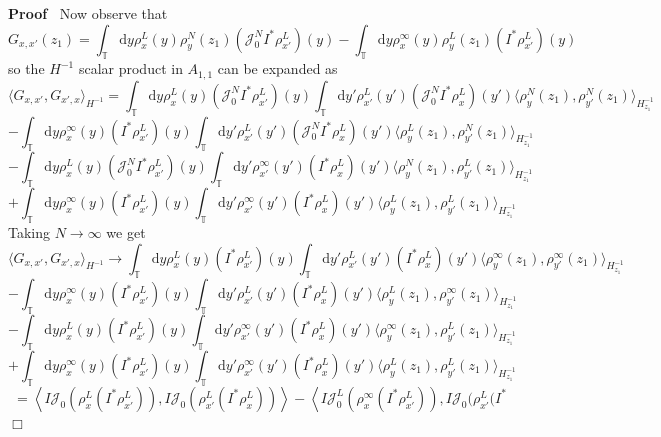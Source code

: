 \documentclass[a4paper,11pt]{article}
\newcommand{\mathd}{\mathrm{d}}
\newenvironment{proof}{\noindent\textbf{Proof\ }}{\hspace*{\fill}$\Box$\medskip}
\newcommand{\JJ}{\mathcal{J}}
\begin{document}
\begin{proof}
  Now observe that
  \[ G_{x, x'} (z_1) = \int_{\mathbb{T}} \mathd y \rho_x^L (y) \rho^N_y (z_1)
     (\JJ^N_0 I^{\ast} \rho_{x'}^L) (y) - \int_{\mathbb{T}} \mathd y
     \rho_x^{\infty} (y) \rho^L_y (z_1) (I^{\ast} \rho_{x'}^L) (y) \]
  so the $H^{- 1}$ scalar product in $A_{1, 1}$ can be expanded as
  \[ \langle G_{x, x'}, G_{x', x} \rangle_{H^{- 1}} = \int_{\mathbb{T}}
     \mathd y \rho_x^L (y) (\JJ^N_0 I^{\ast} \rho_{x'}^L) (y)
     \int_{\mathbb{T}} \mathd y' \rho_{x'}^L (y') (\JJ^N_0 I^{\ast} \rho_x^L)
     (y') \langle \rho^N_y (z_1), \rho^N_{y'} (z_1) \rangle_{H^{- 1}_{z_1}} \]
  \[ - \int_{\mathbb{T}} \mathd y \rho_x^{\infty} (y) (I^{\ast} \rho_{x'}^L)
     (y) \int_{\mathbb{T}} \mathd y' \rho_{x'}^L (y') (\JJ^N_0 I^{\ast}
     \rho_x^L) (y') \langle \rho^L_y (z_1), \rho^N_{y'} (z_1) \rangle_{H^{-
     1}_{z_1}} \]
  \[ - \int_{\mathbb{T}} \mathd y \rho_x^L (y) (\JJ^N_0 I^{\ast} \rho_{x'}^L)
     (y) \int_{\mathbb{T}} \mathd y' \rho_{x'}^{\infty} (y') (I^{\ast}
     \rho_x^L) (y') \langle \rho^N_y (z_1), \rho^L_{y'} (z_1) \rangle_{H^{-
     1}_{z_1}} \]
  \[ + \int_{\mathbb{T}} \mathd y \rho_x^{\infty} (y) (I^{\ast} \rho_{x'}^L)
     (y) \int_{\mathbb{T}} \mathd y' \rho_{x'}^{\infty} (y') (I^{\ast}
     \rho_x^L) (y') \langle \rho^L_y (z_1), \rho^L_{y'} (z_1) \rangle_{H^{-
     1}_{z_1}} \]
  Taking $N \rightarrow \infty$ we get
  \[ \langle G_{x, x'}, G_{x', x} \rangle_{H^{- 1}} \rightarrow
     \int_{\mathbb{T}} \mathd y \rho_x^L (y) (I^{\ast} \rho_{x'}^L) (y)
     \int_{\mathbb{T}} \mathd y' \rho_{x'}^L (y') (I^{\ast} \rho_x^L) (y')
     \langle \rho^{\infty}_y (z_1), \rho^{\infty}_{y'} (z_1) \rangle_{H^{-
     1}_{z_1}} \]
  \[ - \int_{\mathbb{T}} \mathd y \rho_x^{\infty} (y) (I^{\ast} \rho_{x'}^L)
     (y) \int_{\mathbb{T}} \mathd y' \rho_{x'}^L (y') (I^{\ast} \rho_x^L)
     (y') \langle \rho^L_y (z_1), \rho^{\infty}_{y'} (z_1) \rangle_{H^{-
     1}_{z_1}} \]
  \[ - \int_{\mathbb{T}} \mathd y \rho_x^L (y) (I^{\ast} \rho_{x'}^L) (y)
     \int_{\mathbb{T}} \mathd y' \rho_{x'}^{\infty} (y') (I^{\ast} \rho_x^L)
     (y') \langle \rho^{\infty}_y (z_1), \rho^L_{y'} (z_1) \rangle_{H^{-
     1}_{z_1}} \]
  \[ + \int_{\mathbb{T}} \mathd y \rho_x^{\infty} (y) (I^{\ast} \rho_{x'}^L)
     (y) \int_{\mathbb{T}} \mathd y' \rho_{x'}^{\infty} (y') (I^{\ast}
     \rho_x^L) (y') \langle \rho^L_y (z_1), \rho^L_{y'} (z_1) \rangle_{H^{-
     1}_{z_1}} \]
  \[ = \left\langle I \JJ_0 (\rho^L_x (I^{\ast} \rho_{x'}^L)), I \JJ_0
     (\rho_{x'}^L (I^{\ast} \rho_x^L)) \right\rangle - \left\langle I \JJ_0^L
     (\rho^{\infty}_x (I^{\ast} \rho_{x'}^L)), I \JJ_0 (\rho_{x'}^L (I^{\ast}
\]
\end{proof}
\end{document}
